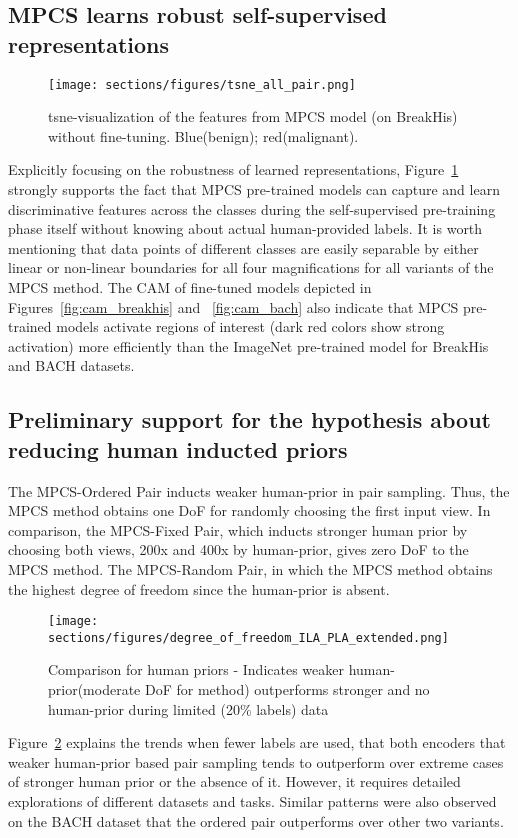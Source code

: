 \documentclass[conference]{IEEEtran}
\begin{document}
\subsection{MPCS learns robust self-supervised representations}
\begin{figure}[!ht]
    \centering
    \texttt{[image: sections/figures/tsne\_all\_pair.png]}
    \caption{tsne-visualization of the features from MPCS model (on BreakHis) without fine-tuning. Blue(benign); red(malignant).  }
    \label{fig:tsne}
    \vspace{-4mm}
\end{figure}
Explicitly focusing on the robustness of learned representations, Figure~\ref{fig:tsne} strongly supports the fact that MPCS pre-trained models can capture and learn discriminative features across the classes during the self-supervised pre-training phase itself without knowing about actual human-provided labels. It is worth mentioning that data points of different classes are easily separable by either linear or non-linear boundaries for all four magnifications for all variants of the MPCS method. The CAM of fine-tuned models depicted in Figures~\ref{fig:cam_breakhis} and ~\ref{fig:cam_bach} also indicate that MPCS pre-trained models activate regions of interest (dark red colors show strong activation) more efficiently than the ImageNet pre-trained model for BreakHis and BACH datasets.  
\subsection{Preliminary support for the hypothesis  about reducing human inducted priors}
The MPCS-Ordered Pair inducts weaker human-prior in pair sampling. Thus, the MPCS method obtains one DoF for randomly choosing the first input view. In comparison, the MPCS-Fixed Pair, which inducts stronger human prior by choosing both views, 200x and 400x by human-prior, gives zero DoF to the MPCS method. The MPCS-Random Pair, in which the MPCS method obtains the highest degree of freedom since the human-prior is absent.
\begin{figure}[!ht]
    \centering
    \texttt{[image: sections/figures/degree\_of\_freedom\_ILA\_PLA\_extended.png]}
    \caption{Comparison for human priors - Indicates weaker human-prior(moderate DoF for method) outperforms stronger and no human-prior during limited (20\% labels) data\\}
    \label{fig:degree_of_freedom_ILA_PLA}
    \vspace{-8mm}
\end{figure}
Figure~\ref{fig:degree_of_freedom_ILA_PLA} explains the trends when fewer labels are used, that both encoders that weaker human-prior based pair sampling tends to outperform over extreme cases of stronger human prior or the absence of it. However, it requires detailed explorations of different datasets and tasks. Similar patterns were also observed on the BACH dataset that the ordered pair outperforms over other two variants.
\end{document}
